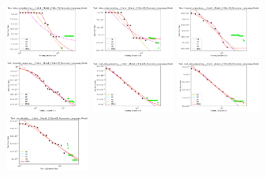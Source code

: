 \documentclass{article} %
\begin{document}
\begin{figure}
    \centering

\includegraphics[width=0.245\textwidth]{figures/scaling_laws_benchmark_dataset_plots__all_functional_forms/__date_understanding_,__1-shot_____262M.png}
\includegraphics[width=0.245\textwidth]{figures/scaling_laws_benchmark_dataset_plots__all_functional_forms/__date_understanding_,__2-shot_____262M.png}
\includegraphics[width=0.245\textwidth]{figures/scaling_laws_benchmark_dataset_plots__all_functional_forms/__linguistic_mappings_,__1-shot_____262M.png}
\includegraphics[width=0.245\textwidth]{figures/scaling_laws_benchmark_dataset_plots__all_functional_forms/__linguistic_mappings_,__2-shot_____262M.png}
\includegraphics[width=0.245\textwidth]{figures/scaling_laws_benchmark_dataset_plots__all_functional_forms/__mult_data_wrangling_,__1-shot_____262M.png}
\includegraphics[width=0.245\textwidth]{figures/scaling_laws_benchmark_dataset_plots__all_functional_forms/__mult_data_wrangling_,__2-shot_____262M.png}
\includegraphics[width=0.245\textwidth]{figures/scaling_laws_benchmark_dataset_plots__all_functional_forms/__qa_wikidata_,__1-shot_____262M.png}

\end{figure}
\end{document}
